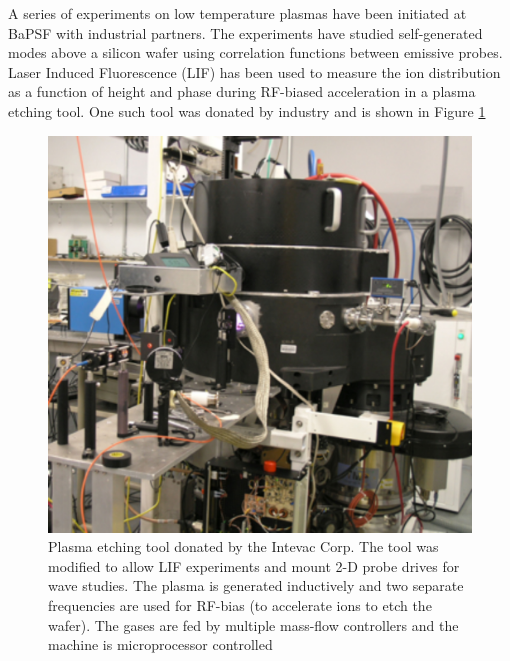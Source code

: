 \documentclass[11pt]{article}
\begin{document}
A series of experiments on low temperature plasmas have been initiated at BaPSF with industrial partners.  The experiments have studied self-generated modes above a silicon wafer using correlation functions between emissive probes.  Laser Induced Fluorescence (LIF) has been used to measure the ion distribution as a function of height and phase during RF-biased acceleration in a plasma etching tool.  One such tool was donated by industry and is shown in Figure \ref{fig:etchtool}
\begin{figure}[h]
\centering
  \begin{minipage}[c]{0.5\textwidth}
    \includegraphics[width=\textwidth]{etchtool.jpg}
  \end{minipage}\hfill
  \begin{minipage}[c]{0.4\textwidth}
    \caption{Plasma etching tool donated by the Intevac Corp.  The tool was modified to allow LIF experiments and mount 2-D probe drives for wave studies.  The plasma is generated inductively and two separate frequencies are used for RF-bias (to accelerate ions to etch the wafer). The gases are fed by multiple mass-flow controllers and the machine is microprocessor controlled} 
    \label{fig:etchtool}
  \end{minipage}
\end{figure}
\end{document}
